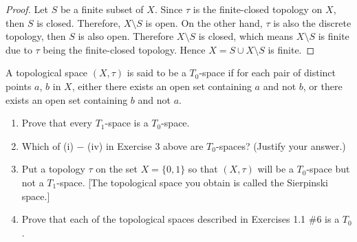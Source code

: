 \begin{proof}
    Let $S$ be a finite subset of $X$. Since $\tau$ is the finite-closed topology on $X$, then $S$ is closed. Therefore, $X\setminus S$ is open. On the other hand, $\tau$ is also the discrete topology, then $S$ is also open. Therefore $X\setminus S$ is closed, which means $X\setminus S$ is finite due to $\tau$ being the finite-closed topology. Hence $X = S\cup X\setminus S$ is finite.
\end{proof}
\newpage

\begin{exercise}
    A topological space $(X, \tau)$ is said to be a {\color{red}$T_{0}$-space} if for each pair of distinct points $a$, $b$ in $X$, either there exists an open set containing $a$ and not $b$, or there exists an open set containing $b$ and not $a$.
    \begin{enumerate}[label={(\roman*)}]
        \item Prove that every $T_{1}$-space is a $T_{0}$-space.
        \item Which of (i) $-$ (iv) in Exercise 3 above are $T_{0}$-spaces? (Justify your answer.)
        \item Put a topology $\tau$ on the set $X = \{ 0, 1 \}$ so that $(X, \tau)$ will be a $T_{0}$-space but not a $T_{1}$-space. [The topological space you obtain is called the {\color{red}Sierpinski space}.]
        \item Prove that each of the topological spaces described in Exercises 1.1 \#6 is a $T_{0}$.
    \end{enumerate}
\end{exercise}


